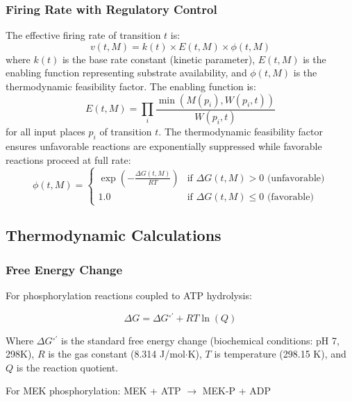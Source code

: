 \documentclass[twocolumn,11pt]{article}
\newcommand{\dg}{\Delta G}
\begin{document}
\subsubsection{Firing Rate with Regulatory Control}

The effective firing rate of transition $t$ is:
\begin{equation}
v(t, M) = k(t) \times E(t, M) \times \phi(t, M)
\end{equation}
where $k(t)$ is the base rate constant (kinetic parameter), $E(t, M)$ is the enabling function representing substrate availability, and $\phi(t, M)$ is the thermodynamic feasibility factor. The enabling function is:
\begin{equation}
E(t, M) = \prod_{i} \frac{\min(M(p_i), W(p_i,t))}{W(p_i,t)}
\end{equation}
for all input places $p_i$ of transition $t$. The thermodynamic feasibility factor ensures unfavorable reactions are exponentially suppressed while favorable reactions proceed at full rate:
\begin{equation}
\phi(t, M) = \begin{cases}
\exp\left(-\frac{\dg{}(t,M)}{RT}\right) & \text{if } \dg{}(t,M) > 0 \text{ (unfavorable)} \\
1.0 & \text{if } \dg{}(t,M) \leq 0 \text{ (favorable)}
\end{cases}
\end{equation}

\subsection{Thermodynamic Calculations}

\subsubsection{Free Energy Change}

For phosphorylation reactions coupled to ATP hydrolysis:

\begin{equation}
\dg{} = \dg{}^{\circ\prime} + RT \ln(Q)
\end{equation}

Where $\dg{}^{\circ\prime}$ is the standard free energy change (biochemical conditions: pH 7, 298K), $R$ is the gas constant (8.314 J/mol$\cdot$K), $T$ is temperature (298.15 K), and $Q$ is the reaction quotient.

For MEK phosphorylation: MEK + ATP $\to$ MEK-P + ADP
\end{document}
